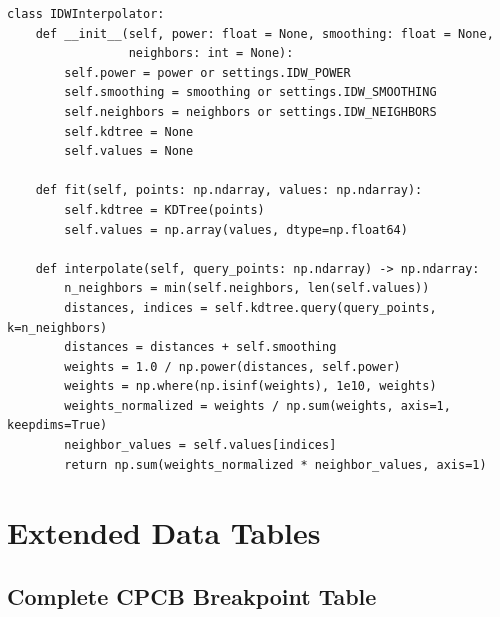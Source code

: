 \documentclass[12pt,a4paper]{article}
\begin{document}
\begin{lstlisting}[caption={KD-tree optimised IDW query
                            (backend/core/idw\_interpolation.py)},
                   label=lst:idw]
class IDWInterpolator:
    def __init__(self, power: float = None, smoothing: float = None,
                 neighbors: int = None):
        self.power = power or settings.IDW_POWER
        self.smoothing = smoothing or settings.IDW_SMOOTHING
        self.neighbors = neighbors or settings.IDW_NEIGHBORS
        self.kdtree = None
        self.values = None

    def fit(self, points: np.ndarray, values: np.ndarray):
        self.kdtree = KDTree(points)
        self.values = np.array(values, dtype=np.float64)

    def interpolate(self, query_points: np.ndarray) -> np.ndarray:
        n_neighbors = min(self.neighbors, len(self.values))
        distances, indices = self.kdtree.query(query_points, k=n_neighbors)
        distances = distances + self.smoothing
        weights = 1.0 / np.power(distances, self.power)
        weights = np.where(np.isinf(weights), 1e10, weights)
        weights_normalized = weights / np.sum(weights, axis=1, keepdims=True)
        neighbor_values = self.values[indices]
        return np.sum(weights_normalized * neighbor_values, axis=1)
\end{lstlisting}

\clearpage

\section{Extended Data Tables}
\label{app:tables}

\subsection{Complete CPCB Breakpoint Table}
\label{app:tables:breaks}
\end{document}
